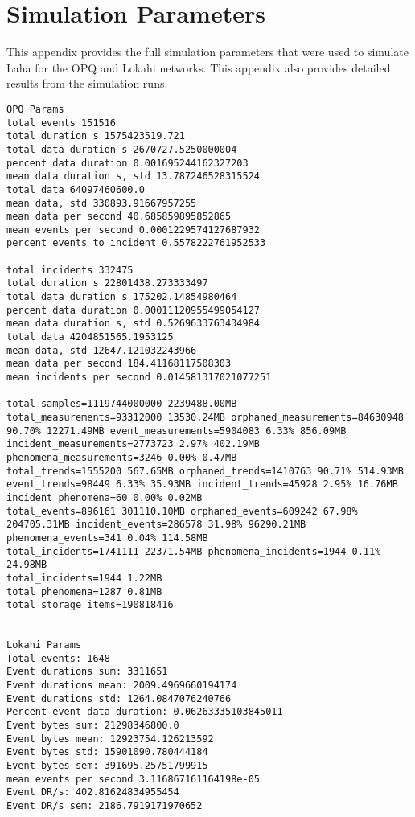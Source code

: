 \chapter{Simulation Parameters}\label{appendix:simulation_parameters}

This appendix provides the full simulation parameters that were used to simulate Laha for the OPQ and Lokahi networks. This appendix also provides detailed results from the simulation runs.

\begin{lstlisting}
OPQ Params
total events 151516
total duration s 1575423519.721
total data duration s 2670727.5250000004
percent data duration 0.001695244162327203
mean data duration s, std 13.787246528315524
total data 64097460600.0
mean data, std 330893.91667957255
mean data per second 40.685859895852865
mean events per second 0.0001229574127687932
percent events to incident 0.5578222761952533

total incidents 332475
total duration s 22801438.273333497
total data duration s 175202.14854980464
percent data duration 0.00011120955499054127
mean data duration s, std 0.5269633763434984
total data 4204851565.1953125
mean data, std 12647.121032243966
mean data per second 184.41168117508303
mean incidents per second 0.014581317021077251

total_samples=1119744000000 2239488.00MB
total_measurements=93312000 13530.24MB orphaned_measurements=84630948 90.70% 12271.49MB event_measurements=5904083 6.33% 856.09MB incident_measurements=2773723 2.97% 402.19MB phenomena_measurements=3246 0.00% 0.47MB
total_trends=1555200 567.65MB orphaned_trends=1410763 90.71% 514.93MB event_trends=98449 6.33% 35.93MB incident_trends=45928 2.95% 16.76MB incident_phenomena=60 0.00% 0.02MB
total_events=896161 301110.10MB orphaned_events=609242 67.98% 204705.31MB incident_events=286578 31.98% 96290.21MB phenomena_events=341 0.04% 114.58MB
total_incidents=1741111 22371.54MB phenomena_incidents=1944 0.11% 24.98MB
total_incidents=1944 1.22MB
total_phenomena=1287 0.81MB
total_storage_items=190818416


Lokahi Params
Total events: 1648
Event durations sum: 3311651
Event durations mean: 2009.4969660194174
Event durations std: 1264.0847076240766
Percent event data duration: 0.06263335103845011
Event bytes sum: 21298346800.0
Event bytes mean: 12923754.126213592
Event bytes std: 15901090.780444184
Event bytes sem: 391695.25751799915
mean events per second 3.116867161164198e-05
Event DR/s: 402.81624834955454
Event DR/s sem: 2186.7919171970652


\end{lstlisting}
